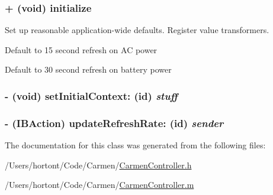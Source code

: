 \hypertarget{interface_carmen_controller_188c5bdfc74f32db0c55e28733d24324}{
\subsubsection[initialize]{\setlength{\rightskip}{0pt plus 5cm}+ (void) initialize }}
\label{interface_carmen_controller_188c5bdfc74f32db0c55e28733d24324}


Set up reasonable application-wide defaults. Register value transformers. 

Default to 15 second refresh on AC power

Default to 30 second refresh on battery power \hypertarget{interface_carmen_controller_6112359aad17b09d7772b0869937482e}{
\subsubsection[setInitialContext:]{\setlength{\rightskip}{0pt plus 5cm}- (void) setInitialContext: (id) {\em stuff}}}
\label{interface_carmen_controller_6112359aad17b09d7772b0869937482e}


\hypertarget{interface_carmen_controller_e0c863ef0e9b896a42536c29f387b573}{
\subsubsection[updateRefreshRate:]{\setlength{\rightskip}{0pt plus 5cm}- (IBAction) updateRefreshRate: (id) {\em sender}}}
\label{interface_carmen_controller_e0c863ef0e9b896a42536c29f387b573}




The documentation for this class was generated from the following files:\begin{CompactItemize}
\item 
/Users/hortont/Code/Carmen/\hyperlink{_carmen_controller_8h}{CarmenController.h}\item 
/Users/hortont/Code/Carmen/\hyperlink{_carmen_controller_8m}{CarmenController.m}\end{CompactItemize}
